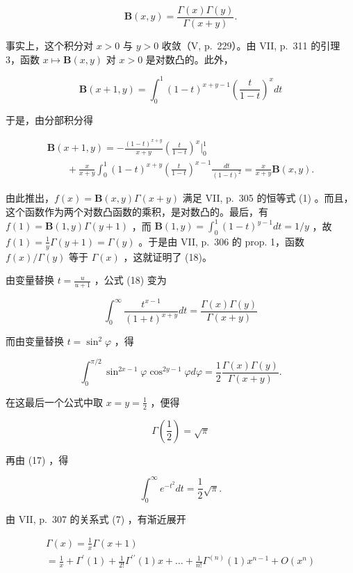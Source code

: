 \[
\mathbf {B} (x, y) = \frac {\Gamma (x) \Gamma (y)}{\Gamma (x + y)}.\tag{18}
\]

事实上，这个积分对 \(x > 0\) 与 \(y > 0\) 收敛（V, p.~229）。由 VII, p.~311 的引理 3，函数 \(x \mapsto \mathbf{B}(x, y)\) 对 \(x > 0\) 是对数凸的。此外，

\[
\mathbf {B} (x + 1, y) = \int_ {0} ^ {1} (1 - t) ^ {x + y - 1} \left(\frac {t}{1 - t}\right) ^ {x} d t
\]

于是，由分部积分得

\[
\begin{array}{l} \mathbf {B} (x + 1, y) = - \frac {(1 - t) ^ {x + y}}{x + y} \left(\frac {t}{1 - t}\right) ^ {x} \Bigg | _ {0} ^ {1} \\ \qquad + \frac {x}{x + y} \int_ {0} ^ {1} (1 - t) ^ {x + y} \left(\frac {t}{1 - t}\right) ^ {x - 1} \frac {d t}{(1 - t) ^ {2}} = \frac {x}{x + y} \mathbf {B} (x, y). \end{array}
\]

由此推出，\(f(x) = \mathbf{B}(x, y) \Gamma(x + y)\) 满足 VII, p.~305 的恒等式 (1) 。而且，这个函数作为两个对数凸函数的乘积，是对数凸的。最后，有 \(f(1) = \mathbf{B}(1, y) \Gamma(y + 1)\) ，而 \(\mathbf{B}(1, y) = \int_{0}^{1} (1 - t)^{y - 1} dt = 1/y\) ，故 \(f(1) = \frac{1}{y} \Gamma(y + 1) = \Gamma(y)\) 。于是由 VII, p.~306 的 prop. 1，函数 \(f(x)/\Gamma(y)\) 等于 \(\Gamma(x)\) ，这就证明了 (18)。

由变量替换 \(t = \frac{u}{u + 1}\) ，公式 (18) 变为

\[
\int_ {0} ^ {\infty} \frac {t ^ {x - 1}}{(1 + t) ^ {x + y}} d t = \frac {\Gamma (x) \Gamma (y)}{\Gamma (x + y)}\tag{19}
\]

而由变量替换 \(t = \sin^{2} \varphi\) ，得

\[
\int_ {0} ^ {\pi / 2} \sin^ {2 x - 1} \varphi \cos^ {2 y - 1} \varphi d \varphi = \frac {1}{2} \frac {\Gamma (x) \Gamma (y)}{\Gamma (x + y)}.\tag{20}
\]

在这最后一个公式中取 \(x = y = \frac{1}{2}\) ，便得

\[
\Gamma (\frac {1}{2}) = \sqrt {\pi}\tag{21}
\]

再由 (17) ，得

\[
\int_ {0} ^ {\infty} e ^ {- t ^ {2}} d t = \frac {1}{2} \sqrt {\pi}.\tag{22}
\]

由 VII, p.~307 的关系式 (7) ，有渐近展开

\[
\begin{array}{l} \Gamma (x) = \frac {1}{x} \Gamma (x + 1) \\ = \frac {1}{x} + \Gamma^ {\prime} (1) + \frac {1}{2 !} \Gamma^ {\prime \prime} (1) x + \dots + \frac {1}{n !} \Gamma^ {(n)} (1) x ^ {n - 1} + O (x ^ {n}) \end{array}\tag{23}
\]

